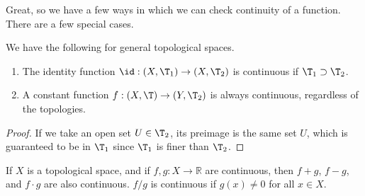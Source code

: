   Great, so we have a few ways in which we can check continuity of a function. There are a few special cases. 

  \begin{lemma}
    We have the following for general topological spaces. 
    \begin{enumerate}
      \item The identity function $\id: (X, \T_1) \rightarrow (X, \T_2)$ is continuous if $\T_1 \supset \T_2$. 
      \item A constant function $f: (X, \T) \rightarrow (Y, \T_2)$ is always continuous, regardless of the topologies. 
    \end{enumerate}
  \end{lemma}
  \begin{proof}
    If we take an open set $U \in \T_2$, its preimage is the same set $U$, which is guaranteed to be in $\T_1$ since $\T_1$ is finer than $\T_2$. 
  \end{proof}


  \begin{theorem}
		\label{thm:arithmetic_continuous}
    If $X$ is a topological space, and if $f, g: X \longrightarrow \mathbb{R}$ are continuous, then $f + g$, $f-g$, and $f \cdot g$ are also continuous. $f / g$ is continuous if $g(x) \neq 0$ for all $x \in X$. 
  \end{theorem}

